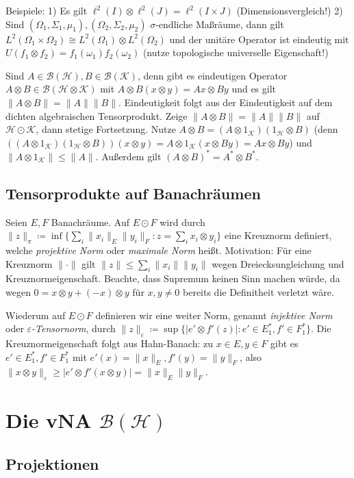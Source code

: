 \documentclass[11pt,a4paper]{scrartcl}
\newcommand{\Hc}{\mathcal{H}}
\newcommand{\Kc}{\mathcal{K}}
\newcommand{\B}{\mathcal{B}}
\theoremstyle{plain}
\theoremstyle{definition}
\theoremstyle{remark}
\begin{document}
Beispiele: 1) Es gilt $\ell^2(I)\otimes \ell^2(J) = \ell^2(I\times J)$ (Dimensionsvergleich!) 2) Sind $(\Omega_1, \Sigma_1,\mu_1), (\Omega_2,\Sigma_2,\mu_2)$ $\sigma$-endliche Maßräume, dann gilt $L^2(\Omega_1\times \Omega_2) \cong L^2(\Omega_1)\otimes L^2(\Omega_2)$ und der unitäre Operator ist eindeutig mit $U(f_1\otimes f_2) = f_1(\omega_1)f_2(\omega_2)$ (nutze topologische universelle Eigenschaft!)

Sind $A\in \B(\Hc), B\in \B(\Kc)$, denn gibt es eindeutigen Operator $A\otimes B\in \B(\Hc\otimes \Kc)$ mit $A\otimes B(x\otimes y)=Ax\otimes By$ und es gilt $\|A\otimes B\|=\|A\|\|B\|$. Eindeutigkeit folgt aus der Eindeutigkeit auf dem dichten algebraischen Tensorprodukt. Zeige $\|A\otimes B\|=\|A\|\|B\|$ auf $\Hc \odot \Kc$, dann stetige Fortsetzung. Nutze $A\otimes B=(A\otimes 1_\Kc)(1_\Hc\otimes B)$ (denn $((A\otimes 1_\Kc)(1_\Hc\otimes B))(x\otimes y)=A\otimes 1_\Kc(x\otimes By)=Ax\otimes By$) und $\|A\otimes 1_\Kc\| \leq \|A\|$. Außerdem gilt $(A\otimes B)^*=A^*\otimes B^*$.

\subsection{Tensorprodukte auf Banachräumen}

Seien $E,F$ Banachräume. Auf $E\odot F$ wird durch $\|z\|_\pi \coloneqq \inf \{ \sum_i \|x_i\|_E \|y_i\|_F: z = \sum_i x_i \otimes y_i \}$ eine Kreuznorm definiert, welche \emph{projektive Norm} oder \emph{maximale Norm} heißt. Motivation: Für eine Kreuznorm $\|\cdot\|$ gilt $\|z\|\leq \sum_i \|x_i\|\|y_i\|$ wegen Dreiecksungleichung und Kreuznormeigenschaft. Beachte, dass Supremum keinen Sinn machen würde, da wegen $0=x\otimes y + (-x)\otimes y$ für $x,y\neq 0$ bereits die Definitheit verletzt wäre.

Wiederum auf $E\odot F$ definieren wir eine weiter Norm, genannt \emph{injektive Norm} oder \emph{$\varepsilon$-Tensornorm}, durch $\|z\|_\varepsilon \coloneqq \sup \{ |e'\otimes f'(z)|: e'\in E^*_1, f'\in F^*_1 \}$. Die Kreuznormeigenschaft folgt aus Hahn-Banach: zu $x\in E, y\in F$ gibt es $e'\in E^*_1, f'\in F^*_1$ mit $e'(x)=\|x\|_E, f'(y)=\|y\|_F$, also $\|x\otimes y\|_\varepsilon \geq |e'\otimes f'(x\otimes y)|=\|x\|_E \|y\|_F$.

\section{Die vNA $\B(\Hc)$}

\subsection{Projektionen}
\end{document}
